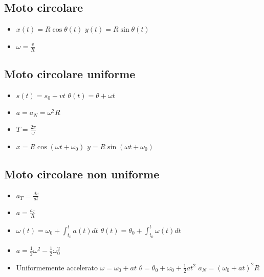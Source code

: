 	\subsection{Moto circolare}
	\begin{itemize}
		\item $x(t) = R\cos\theta(t)$ $y(t) = R\sin\theta(t)$
		\item $\omega = \frac{v}{R}$
	\end{itemize}
	\subsection{Moto circolare uniforme}
	\begin{itemize}
		\item $s(t) = s_0 + vt$ $\theta(t) = \theta+\omega t$
		\item $a = a_N = \omega^2R$
		\item $T = \frac{2\pi}{\omega}$
		\item $x = R\cos(\omega t+\omega_0)$ $y = R\sin(\omega t+\omega_0)$
	\end{itemize}
	\subsection{Moto circolare non uniforme}
	\begin{itemize}
		\item $a_T=\frac{dv}{dt}$
		\item $a = \frac{a_T}{R}$
		\item $\omega(t)=\omega_0+\int_{t_0}^t a(t)dt$ $\theta(t) = \theta_0 + \int_{t_0}^t\omega(t)dt$
		\item $a = \frac{1}{2}\omega^2-\frac{1}{2}\omega^2_0$
		\item Uniformemente accelerato $\omega = \omega_0+at$ $\theta = \theta_0 + \omega_0+\frac{1}{2}at^2$ $a_N = (\omega_0+at)^2 R$
	\end{itemize}
